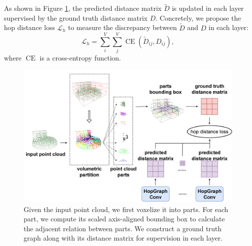 \documentclass[letterpaper]{article} %
\begin{document}
As shown in Figure \ref{fig:hop_distance}, the predicted distance matrix \(\tilde{D}\) is updated in each layer supervised by the ground truth distance matrix \(D\).
Concretely, we propose the hop distance loss \(\mathcal{L}_h\) to measure the discrepancy between \(\tilde{D}\) and \(D\) in each layer:
\begin{equation}
\mathcal{L}_h = \sum_{i}^{V} \sum_{j}^{V} \operatorname{CE}(\tilde{D}_{i j}, D_{i j}),
\end{equation}
where \(\operatorname{CE}\) is a cross-entropy function.


\begin{figure}[!h]
\centering
\begin{minipage}[b]{1.0\linewidth}
\begin{center}
\includegraphics[width=1.0\linewidth]{images/hop_distance.jpg}
\end{center}
\end{minipage}
\caption{
Given the input point cloud, we first voxelize it into parts.
For each part, we compute its scaled axis-aligned bounding box to calculate the adjacent relation between parts. We construct a ground truth graph along with its distance matrix for supervision in each layer.
}
\label{fig:hop_distance}
\end{figure}
\end{document}
